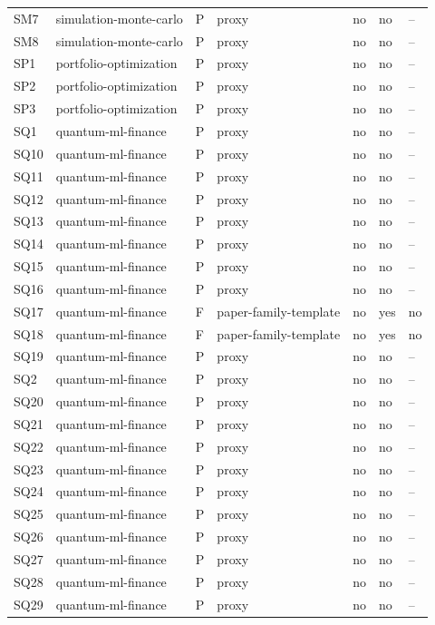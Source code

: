\begin{tabular}{lllllll}
SM7 & simulation-monte-carlo & P & proxy & no & no & -- \\
SM8 & simulation-monte-carlo & P & proxy & no & no & -- \\
SP1 & portfolio-optimization & P & proxy & no & no & -- \\
SP2 & portfolio-optimization & P & proxy & no & no & -- \\
SP3 & portfolio-optimization & P & proxy & no & no & -- \\
SQ1 & quantum-ml-finance & P & proxy & no & no & -- \\
SQ10 & quantum-ml-finance & P & proxy & no & no & -- \\
SQ11 & quantum-ml-finance & P & proxy & no & no & -- \\
SQ12 & quantum-ml-finance & P & proxy & no & no & -- \\
SQ13 & quantum-ml-finance & P & proxy & no & no & -- \\
SQ14 & quantum-ml-finance & P & proxy & no & no & -- \\
SQ15 & quantum-ml-finance & P & proxy & no & no & -- \\
SQ16 & quantum-ml-finance & P & proxy & no & no & -- \\
SQ17 & quantum-ml-finance & F & paper-family-template & no & yes & no \\
SQ18 & quantum-ml-finance & F & paper-family-template & no & yes & no \\
SQ19 & quantum-ml-finance & P & proxy & no & no & -- \\
SQ2 & quantum-ml-finance & P & proxy & no & no & -- \\
SQ20 & quantum-ml-finance & P & proxy & no & no & -- \\
SQ21 & quantum-ml-finance & P & proxy & no & no & -- \\
SQ22 & quantum-ml-finance & P & proxy & no & no & -- \\
SQ23 & quantum-ml-finance & P & proxy & no & no & -- \\
SQ24 & quantum-ml-finance & P & proxy & no & no & -- \\
SQ25 & quantum-ml-finance & P & proxy & no & no & -- \\
SQ26 & quantum-ml-finance & P & proxy & no & no & -- \\
SQ27 & quantum-ml-finance & P & proxy & no & no & -- \\
SQ28 & quantum-ml-finance & P & proxy & no & no & -- \\
SQ29 & quantum-ml-finance & P & proxy & no & no & -- \\

\end{tabular}
